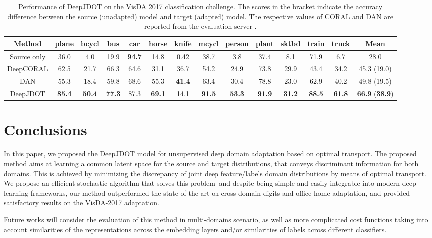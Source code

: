 \documentclass[runningheads]{llncs}
\begin{document}
\begin{table}[t]
\centering
\caption{Performance of DeepJDOT on the VisDA 2017 classification challenge. The scores in the bracket indicate the accuracy difference between the source (unadapted) model and target (adapted) model. The respective values of CORAL and DAN are reported from the evaluation server .}\label{tab:visda}\scriptsize{
\begin{tabular}{c|cccccccccccc|c}
\hline
Method&plane&	bcycl&	bus&	car&	horse&	knife&	mcycl&	person&	plant&	sktbd&	train&	truck & Mean \\\hline
Source only & 36.0 & 4.0& 19.9 & {\bf 94.7} & 14.8 & 0.42 & 38.7 & 3.8 & 37.4 & 8.1& 71.9 & 6.7 & 28.0 \\
DeepCORAL \cite{deepcoral} &	62.5&21.7	& 66.3&64.6	&31.1&36.7	&54.2	&24.9	&73.8	&29.9&43.4	&34.2	&45.3 (19.0) \\
DAN \cite{long15} &55.3	&18.4	&59.8&68.6	&55.3	&{\bf 41.4}	&63.4	&30.4	&78.8	&23.0	&62.9	&40.2	&49.8 (19.5) \\
DeepJDOT & {\bf 85.4} &  {\bf 50.4} & {\bf 77.3}& 87.3 & {\bf 69.1} & 14.1 & {\bf 91.5} & {\bf 53.3} & {\bf 91.9} & {\bf 31.2} & {\bf 88.5} & {\bf 61.8} &  {\bf 66.9} ({\bf 38.9}) \\
\hline
\end{tabular}}
\end{table} 



 

\section{Conclusions}
In this paper, we proposed the DeepJDOT model for unsupervised deep domain adaptation based on optimal transport. The proposed method aims at learning a common latent space for the source and target distributions, that conveys discriminant information for both domains. This is achieved by minimizing the discrepancy of joint deep feature/labels domain distributions by means of optimal transport. We propose an efficient stochastic algorithm that solves this problem, and despite being simple and easily integrable into modern deep learning frameworks, our method outperformed the state-of-the-art on cross domain digits and office-home adaptation, and provided satisfactory results on the VisDA-2017 adaptation.

Future works will consider the evaluation of this method in multi-domains scenario, as well as more complicated cost functions taking into account similarities of the representations across the embedding layers and/or similarities of labels across different classifiers.
\end{document}

